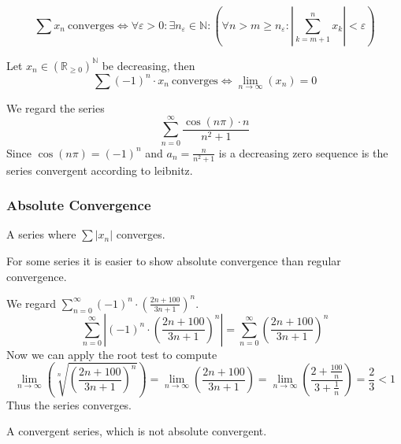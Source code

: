 \begin{theorem}\label{thm:cauchy_crit_ser}
   \[\sum x_n~\text{converges} \iff \forall \varepsilon > 0: \exists n_\varepsilon \in \mathbb{N}: \left(\forall n > m \geq n_\varepsilon: \left| \sum_{k = m + 1}^n x_k \right| < \varepsilon \right)\]
\end{theorem}

\begin{proposition}\label{pro:leibnitz}
   Let \(x_n \in (\mathbb{R}_{\geq 0})^\mathbb{N}\) be decreasing, then
   \[\sum (-1)^{n} \cdot x_n~\text{converges} \iff \lim_{n \to \infty}(x_n) = 0\]
\end{proposition}
\begin{example}
   We regard the series
   \[\sum_{n=0}^\infty \frac{\cos(n \pi) \cdot n}{n^2 + 1}\]
   Since \(\cos(n \pi) = (-1)^n\) and \(a_n = \frac{n}{n^2 + 1}\) is a decreasing zero sequence is the series convergent according to leibnitz.
\end{example}

\subsubsection{Absolute Convergence}
\begin{definition}
   A series where \(\sum |x_n|\) converges.
\end{definition}
\begin{remark}[Tips]
   For some series it is easier to show absolute convergence than regular convergence.
\end{remark}
\begin{example}
   We regard \(\sum_{n=0}^\infty (-1)^n \cdot \left(\frac{2n + 100}{3n + 1}\right)^n\).
   \[\sum_{n=0}^\infty \left\lvert (-1)^n \cdot \left(\frac{2n + 100}{3n + 1}\right)^n \right\rvert = \sum_{n=0}^\infty \left(\frac{2n + 100}{3n + 1}\right)^n\]
   Now we can apply the root test to compute
   \[\lim_{n \to \infty} \left(\sqrt[n]{\left(\frac{2n+100}{3n+1}\right)^n}\right) = \lim_{n \to \infty}\left(\frac{2n+100}{3n+1}\right) = \lim_{n \to \infty}\left(\frac{2 + \frac{100}{n}}{3 + \frac{1}{n}}\right) = \frac{2}{3} < 1\]
   Thus the series converges.
\end{example}

\begin{definition}
   A convergent series, which is not absolute convergent.
\end{definition}

